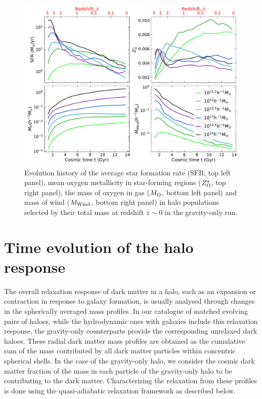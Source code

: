 \begin{figure}[htbp]
\centering
\includegraphics[width=\linewidth]{plots/dynam_relxn/hal_gal_props_evolve.pdf}
\caption{Evolution history of the average star formation rate (SFR, top left panel), mean oxygen metallicity in star-forming regions ($Z^{\star}_{\rm{O}}$, top right panel), the mass of oxygen in gas ($M_{\rm{O}}$, bottom left panel) and mass of wind ($M_{\rm{Wind}}$, bottom right panel) in halo populations selected by their total mass at redshift $z\sim 0$ in the gravity-only run.}
\label{fig:evolution-hal-gal-props}
\end{figure}

\section{Time evolution of the halo response}
\label{sec:methods-relchar}
The overall relaxation response of dark matter in a halo, such as an expansion or contraction in response to galaxy formation, is usually analysed through changes in the spherically averaged mass profiles. In our catalogue of matched evolving pairs of haloes, while the hydrodynamic ones with galaxies include this relaxation response, the gravity-only counterparts provide the corresponding unrelaxed dark haloes. These radial dark matter mass profiles are obtained as the cumulative sum of the mass contributed by all dark matter particles within concentric spherical shells. In the case of the gravity-only halo, we consider the cosmic dark matter fraction of the mass in each particle of the gravity-only halo to be contributing to the dark matter. Characterizing the relaxation from these profiles is done using the quasi-adiabatic relaxation framework as described below.

